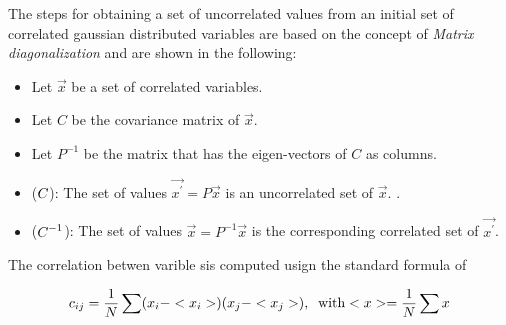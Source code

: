 %
%

The steps for obtaining a set of uncorrelated values from an initial set of correlated gaussian distributed
variables are based on the concept of {\it Matrix diagonalization} and are shown in the following:

\begin{center}
\begin{itemize}
\item Let $\vec{x}$ be a set of correlated variables.
\item Let $C$ be the covariance matrix of $\vec{x}$.
\item Let $P^{-1}$ be the matrix that has the eigen-vectors of $C$ as columns.
\item ($C_{\text{}}$): The set of values $\vec{x^\prime} = P\vec{x}$ is an uncorrelated set of $\vec{x}$. .
\item (${C_{\text{}}}^{-1}$): The set of values $\vec{x} = P^{-1}\vec{x}$ is the corresponding correlated set of $\vec{x^{\prime}}$.
\end{itemize}
\end{center}

\noindent The correlation betwen varible sis computed usign the standard formula of 

\begin{equation}
\centering
c_{ij} = \frac{1}{N} \sum (x_i-<x_i>)(x_j-<x_j>), \;\; \text {with} <x> = \frac{1}{N} \sum x \nonumber
\label{hor_reww_correlation_formula}
\end{equation}

